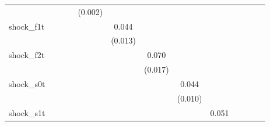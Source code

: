 {\begin{tabular}{l*{12}{c}}
            &                     &                     &                     &     (0.002)         &                     &                     &                     &                     &                     &                     &                     &                     \\
\addlinespace
shock\_f1t   &                     &                     &                     &                     &       0.044\sym{***}&                     &                     &                     &                     &                     &                     &                     \\
            &                     &                     &                     &                     &     (0.013)         &                     &                     &                     &                     &                     &                     &                     \\
\addlinespace
shock\_f2t   &                     &                     &                     &                     &                     &       0.070\sym{***}&                     &                     &                     &                     &                     &                     \\
            &                     &                     &                     &                     &                     &     (0.017)         &                     &                     &                     &                     &                     &                     \\
\addlinespace
shock\_s0t   &                     &                     &                     &                     &                     &                     &       0.044\sym{***}&                     &                     &                     &                     &                     \\
            &                     &                     &                     &                     &                     &                     &     (0.010)         &                     &                     &                     &                     &                     \\
\addlinespace
shock\_s1t   &                     &                     &                     &                     &                     &                     &                     &       0.051\sym{***}&                     &                     &                     &                     \\

\end{tabular}}
